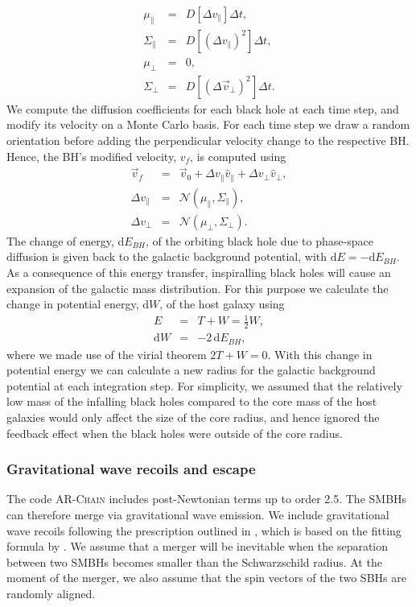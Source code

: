 \documentclass[fleqn,usenatbib,useAMS]{mnras}
\begin{document}
\begin{eqnarray}
\mu_\parallel &=& D[\Delta v_\parallel]\Delta t,\\
\Sigma_\parallel &=& D[(\Delta v_\parallel)^2]\Delta t,\\
\mu_\bot &=& 0,\\
\Sigma_\bot &=& D[(\Delta \vec{v}_\bot)^2]\Delta t.
\end{eqnarray}
We compute the diffusion coefficients for each black hole at each time step, and modify its velocity on a Monte Carlo basis. For each time step we draw a random orientation before adding the perpendicular velocity change to the respective BH. Hence, the BH's modified velocity, $v_f$, is computed using
\begin{eqnarray}
\vec{v}_f &=& \vec{v}_0 + \Delta v_\parallel \hat{v}_\parallel + \Delta v_\bot \hat{v}_\bot,\\
\Delta v_\parallel &=& \mathcal{N}(\mu_\parallel, \Sigma_\parallel),\\
\Delta v_\bot &=& \mathcal{N}(\mu_\bot, \Sigma_\bot).
\end{eqnarray}
The change of energy, $\mbox{d}E_{BH}$, of the orbiting black hole due to phase-space diffusion is given back to the galactic background potential, with $\mbox{d}E = -\mbox{d}E_{BH}$. As a consequence of this energy transfer, inspiralling black holes will cause an expansion of the galactic mass distribution. For this purpose we calculate the change in potential energy, $\mbox{d}W$, of the host galaxy using
\begin{eqnarray}
E &=& T + W = \frac{1}{2}W,\\
\mbox{d}W &=& -2\,\mbox{d}E_{BH},
\end{eqnarray}
where we made use of the virial theorem $2T+W =0$. With this change in potential energy we can calculate a new radius for the galactic background potential at each integration step. For simplicity, we assumed that the relatively low mass of the infalling black holes compared to the core mass of the host galaxies would only affect the size of the core radius, and hence ignored the feedback effect when the black holes were outside of the core radius.

\subsubsection{Gravitational wave recoils and escape}
The code \textsc{AR-Chain} includes post-Newtonian terms up to order 2.5. The SMBHs can therefore merge via gravitational wave emission. We include gravitational wave recoils following the prescription outlined in \citet{2015ApJ...799..178K}, which is based on the fitting formula by \citet{2012PhRvD..85h4015L}.  We assume that a merger will be inevitable when the separation between two SMBHs becomes smaller than the Schwarzschild radius. At the moment of the merger, we also assume that the spin vectors of the two SBHs are randomly aligned.
\end{document}
